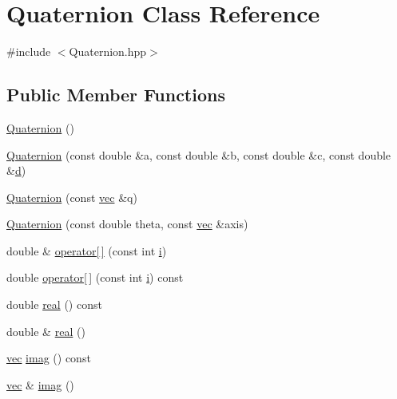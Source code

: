 \hypertarget{classQuaternion}{\section{\-Quaternion \-Class \-Reference}
\label{classQuaternion}
}


{\ttfamily \#include $<$\-Quaternion.\-hpp$>$}

\subsection*{\-Public \-Member \-Functions}
\begin{DoxyCompactItemize}
\item 
\hyperlink{classQuaternion_abcc01358aada56ea5f0db4da18aaf77d}{\-Quaternion} ()
\item 
\hyperlink{classQuaternion_a0ed2b6db4bde7200545a363c7a4481e9}{\-Quaternion} (const double \&a, const double \&b, const double \&c, const double \&\hyperlink{classQuaternion_aece65eacbbafecc1d1db0eab1efbf0de}{d})
\item 
\hyperlink{classQuaternion_abfc8cf462cf0919d7886806e59d49c11}{\-Quaternion} (const \hyperlink{Vector_8hpp_a8c219a6a32f8455685bd1c3c8072e9f5}{vec} \&q)
\item 
\hyperlink{classQuaternion_aa172ed0040b5e748310f2f85e6d48cb8}{\-Quaternion} (const double theta, const \hyperlink{Vector_8hpp_a8c219a6a32f8455685bd1c3c8072e9f5}{vec} \&axis)
\item 
double \& \hyperlink{classQuaternion_a7a9413f93802c41572e0f811f406f7f8}{operator\mbox{[}$\,$\mbox{]}} (const int \hyperlink{classQuaternion_ae54b34d0a320d6efbfd90195d8103bab}{i})
\item 
double \hyperlink{classQuaternion_a49e529d0d72cfb8840d6f6b8a5487401}{operator\mbox{[}$\,$\mbox{]}} (const int \hyperlink{classQuaternion_ae54b34d0a320d6efbfd90195d8103bab}{i}) const 
\item 
double \hyperlink{classQuaternion_a833379488480a4ecf33f64e6ada5f67b}{real} () const 
\item 
double \& \hyperlink{classQuaternion_af75b9d6d20d3942bef386475aa80507e}{real} ()
\item 
\hyperlink{Vector_8hpp_a8c219a6a32f8455685bd1c3c8072e9f5}{vec} \hyperlink{classQuaternion_af00a46e49c6e5c9e9007a53971c991c3}{imag} () const 
\item 
\hyperlink{Vector_8hpp_a8c219a6a32f8455685bd1c3c8072e9f5}{vec} \& \hyperlink{classQuaternion_ae892931b4afd1eb110a2058ee2efc3a4}{imag} ()
\item 

\end{DoxyCompactItemize}
